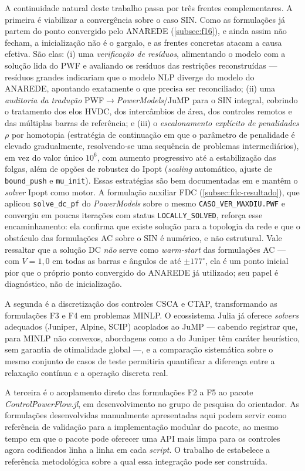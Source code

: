 A continuidade natural deste trabalho passa por três frentes complementares. A primeira é viabilizar a convergência sobre o caso SIN. Como as formulações já partem do ponto convergido pelo ANAREDE (\autoref{subsec:f16}), e ainda assim não fecham, a inicialização não é o gargalo, e as frentes concretas atacam a causa efetiva. São elas: (i) uma \emph{verificação de resíduos}, alimentando o modelo com a solução lida do PWF e avaliando os resíduos das restrições reconstruídas --- resíduos grandes indicariam que o modelo NLP diverge do modelo do ANAREDE, apontando exatamente o que precisa ser reconciliado; (ii) uma \emph{auditoria da tradução} PWF$\rightarrow$\textit{PowerModels}/JuMP para o SIN integral, cobrindo o tratamento dos elos HVDC, dos intercâmbios de área, dos controles remotos e das múltiplas barras de referência; e (iii) o \emph{escalonamento explícito de penalidades} $\rho$ por homotopia (estratégia de continuação em que o parâmetro de penalidade é elevado gradualmente, resolvendo-se uma sequência de problemas intermediários), em vez do valor único $10^6$, com aumento progressivo até a estabilização das folgas, além de opções de robustez do Ipopt (\textit{scaling} automático, ajuste de \texttt{bound\_push} e \texttt{mu\_init}). Essas estratégias são bem documentadas em \cite{molzahn2019survey} e mantêm o \textit{solver} Ipopt como motor. A formulação auxiliar FDC (\autoref{subsec:fdc-resultado}), que aplicou \texttt{solve\_dc\_pf} do \textit{PowerModels} sobre o mesmo \texttt{CASO\_VER\_MAXDIU.PWF} e convergiu em poucas iterações com status \texttt{LOCALLY\_SOLVED}, reforça esse encaminhamento: ela confirma que existe solução para a topologia da rede e que o obstáculo das formulações AC sobre o SIN é numérico, e não estrutural. Vale ressaltar que a solução DC \emph{não} serve como \textit{warm-start} das formulações AC --- com $V = 1{,}0$ em todas as barras e ângulos de até $\pm 177^\circ$, ela é um ponto inicial pior que o próprio ponto convergido do ANAREDE já utilizado; seu papel é diagnóstico, não de inicialização.

A segunda é a discretização dos controles CSCA e CTAP, transformando as formulações F3 e F4 em problemas MINLP. O ecossistema Julia já oferece \textit{solvers} adequados (Juniper, Alpine, SCIP) acoplados ao JuMP --- cabendo registrar que, para MINLP não convexos, abordagens como a do Juniper têm caráter heurístico, sem garantia de otimalidade global ---, e a comparação sistemática sobre o mesmo conjunto de casos de teste permitiria quantificar a diferença entre a relaxação contínua e a operação discreta real.

A terceira é o acoplamento direto das formulações F2 a F5 ao pacote \textit{ControlPowerFlow.jl}, em desenvolvimento no grupo de pesquisa do orientador. As formulações desenvolvidas manualmente apresentadas aqui podem servir como referência de validação para a implementação modular do pacote, ao mesmo tempo em que o pacote pode oferecer uma API mais limpa para os controles agora codificados linha a linha em cada \textit{script}. O trabalho de \cite{chavarry2024} estabelece a referência metodológica sobre a qual essa integração pode ser construída.

